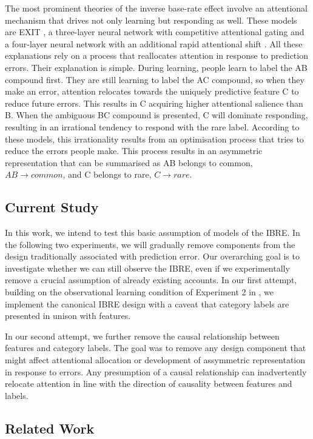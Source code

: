 \documentclass[10pt,letterpaper]{article}
\begin{document}
The most prominent theories of the inverse base-rate effect involve an attentional mechanism that drives not only learning but responding as well.
These models are EXIT \cite{kruschke2001toward}, a three-layer neural network with competitive attentional gating and a four-layer neural network with an additional rapid attentional shift \cite{paskewitz2020dissecting}.
All these explanations rely on a process that reallocates attention in response to prediction errors.
Their explanation is simple.
During learning, people learn to label the AB compound first.
They are still learning to label the AC compound, so when they make an error, attention relocates towards the uniquely predictive feature C to reduce future errors.
This results in C acquiring higher attentional salience than B.
When the ambiguous BC compound is presented, C will dominate responding, resulting in an irrational tendency to respond with the rare label.
According to these models, this irrationality results from an optimisation process that tries to reduce the errors people make.
This process results in an asymmetric representation that can be summarised as AB belongs to common, $AB \to common$, and C belongs to rare, $C \to rare$.

\subsection*{Current Study}

In this work, we intend to test this basic assumption of models of the IBRE.
In the following two experiments, we will gradually remove components from the design traditionally associated with prediction error.
Our overarching goal is to investigate whether we can still observe the IBRE, even if we experimentally remove a crucial assumption of already existing accounts.
In our first attempt, building on the observational learning condition of Experiment 2 in , we implement the canonical IBRE design with a caveat that category labels are presented in unison with features.

In our second attempt, we further remove the causal relationship between features and category labels.
The goal was to remove any design component that might affect attentional allocation or development of assymmetric representation in response to errors.
Any presumption of a causal relationship can inadvertently relocate attention in line with the direction of causality between features and labels.

\subsection*{Related Work}
\end{document}
